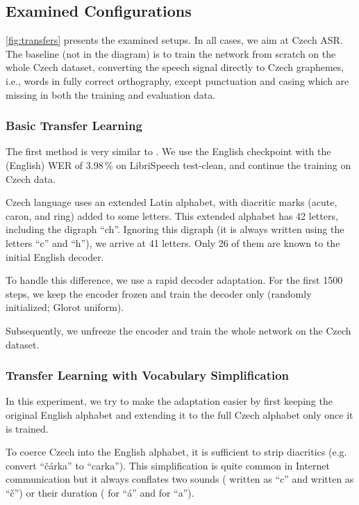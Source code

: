 \subsection{Examined Configurations}
\label{sec:experiments}

\cref{fig:transfers} presents the examined setups. In all cases, we aim at Czech ASR. The baseline (not in the diagram) is to train the network from scratch on the whole Czech dataset, converting the speech signal directly to Czech graphemes, i.e., words in fully correct orthography, except punctuation and casing which are missing in both the training and evaluation data.

\subsubsection{Basic Transfer Learning}
\label{basic_transfer}

The first method is very similar to . We use the English checkpoint with the (English) WER of 3.98\,\% on LibriSpeech test-clean, and continue the training on Czech data.

Czech language uses an extended Latin alphabet, with diacritic marks (acute, caron, and ring) added to some letters. This extended alphabet has 42 letters, including the digraph ``ch''. Ignoring this digraph (it is always written using the letters ``c'' and ``h''), we arrive at 41 letters. Only 26 of them are known to the initial English decoder.

To handle this difference, we use a rapid decoder adaptation. For the first 1500 steps, we keep the encoder frozen and train the decoder only (randomly initialized; Glorot uniform).

Subsequently, we unfreeze the encoder and train the whole network on the Czech dataset.

\subsubsection{Transfer Learning with Vocabulary Simplification}

In this experiment, we try to make the adaptation easier by first keeping the original English alphabet and extending it to the full Czech alphabet only once it is trained.

To coerce Czech into the English alphabet, it is sufficient to strip diacritics (e.g. convert ``\v{c}\'arka'' to ``carka''). This simplification is quite common in Internet communication but it always conflates two sounds (\textipa{[ts]} written as ``c'' and \textipa{[tS]} written as ``\v{c}'')  or their duration (\textipa{[a:]} for ``\'a'' and \textipa{[a]} for ``a'').

